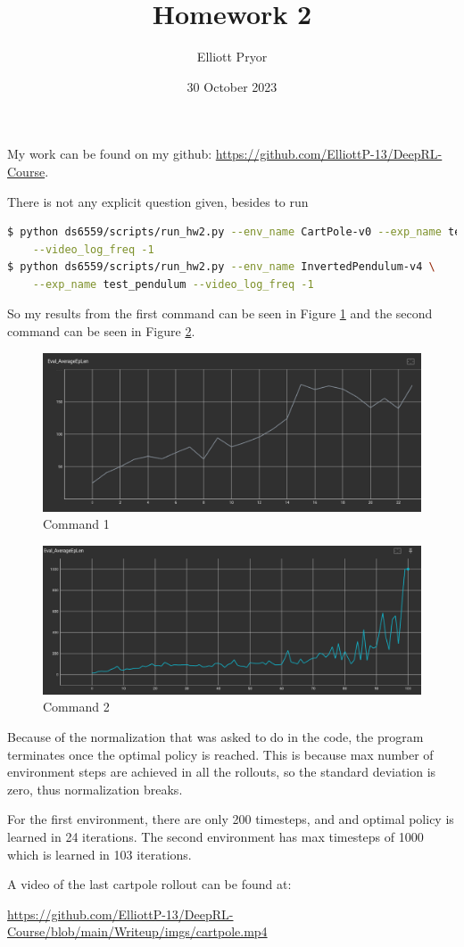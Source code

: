 \documentclass[11pt]{article}
\title{Homework 2}
\author{Elliott Pryor}
\date{30 October 2023}
\begin{document}
\maketitle

My work can be found on my github:
\href{https://github.com/ElliottP-13/DeepRL-Course/tree/main/hw1}{https://github.com/ElliottP-13/DeepRL-Course}.

There is not any explicit question given, besides to run
\begin{lstlisting}[language=Bash]
$ python ds6559/scripts/run_hw2.py --env_name CartPole-v0 --exp_name test_cartpole \
    --video_log_freq -1
$ python ds6559/scripts/run_hw2.py --env_name InvertedPendulum-v4 \
    --exp_name test_pendulum --video_log_freq -1
\end{lstlisting}

So my results from the first command can be seen in Figure \ref{fig:one} and the second command can be seen in Figure \ref{fig:two}.
\begin{figure}[h] 
    \centering
    \includegraphics[width=0.75 \linewidth]{10-30-1_eplen}
    \caption{Command 1}
    \label{fig:one}
\end{figure}

\begin{figure}[h] 
    \centering
    \includegraphics[width=0.75 \linewidth]{10-30-2_eplen}
    \caption{Command 2}
    \label{fig:two}
\end{figure}

Because of the normalization that was asked to do in the code,
the program terminates once the optimal policy is reached.
This is because max number of environment steps are achieved in all the rollouts,
so the standard deviation is zero, thus normalization breaks.

For the first environment, there are only 200 timesteps, and 
and optimal policy is learned in 24 iterations. 
The second environment has max timesteps of 1000 which is learned in 103 iterations.

A video of the last cartpole rollout can be found at:

\href{https://github.com/ElliottP-13/DeepRL-Course/blob/main/Writeup/imgs/cartpole.mp4}{https://github.com/ElliottP-13/DeepRL-Course/blob/main/Writeup/imgs/cartpole.mp4}
\end{document}
